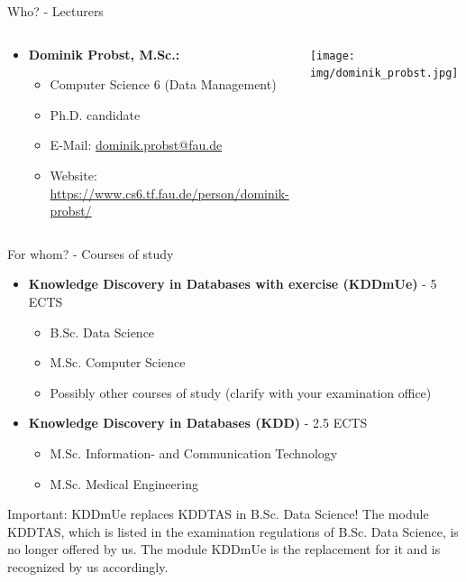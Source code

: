 \begin{frame}{Who? - Lecturers}
	\begin{columns}
		\begin{column}{0.8\textwidth}
			\begin{itemize}
				\item \textbf{Dominik Probst, M.Sc.:}
				      \begin{itemize}
					      \item Computer Science 6 (Data Management)
					      \item Ph.D. candidate
					      \item E-Mail: \href{mailto:dominik.probst@fau.de}{dominik.probst@fau.de}
					      \item Website: \url{https://www.cs6.tf.fau.de/person/dominik-probst/}
				      \end{itemize}
			\end{itemize}
		\end{column}
		\begin{column}{0.2\textwidth}
			\begin{center}
				\texttt{[image: img/dominik\_probst.jpg]}
			\end{center}
		\end{column}
	\end{columns}
\end{frame}

\begin{frame}{For whom? - Courses of study}
	\begin{itemize}
		\item \textbf{Knowledge Discovery in Databases with exercise (KDDmUe)} - 5 ECTS
		      \begin{itemize}
			      \item B.Sc. Data Science
			      \item M.Sc. Computer Science
			      \item {\color{gray} Possibly other courses of study (clarify with your examination office)}
		      \end{itemize}
		\item \textbf{Knowledge Discovery in Databases (KDD)} - 2.5 ECTS
		      \begin{itemize}
			      \item M.Sc. Information- and Communication Technology
			      \item M.Sc. Medical Engineering
		      \end{itemize}
	\end{itemize}

	\begin{alertblock}{Important: KDDmUe replaces KDDTAS in B.Sc. Data Science!}
		The module KDDTAS, which is listed in the examination regulations of B.Sc. Data Science, is no longer offered by us. The module KDDmUe is the replacement for it and is recognized by us accordingly.
	\end{alertblock}
\end{frame}

